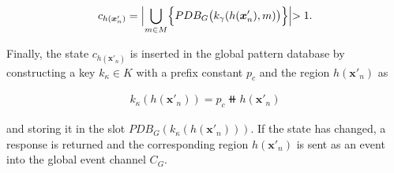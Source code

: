  \begin{align*}
    c_{h(\bm{x}'_n)} = \Bigl| \bigcup_{m \in M} \Bigl\{ PDB_G\bigl(k_\gamma(h(\bm{x}'_n), m)\bigl) \Bigl\}\Bigl| > 1.
 \end{align*}

 Finally, the state $c_{h(\bm{x}'_n)}$ is inserted in the global pattern database by constructing a key $k_\kappa \in K$ with a prefix constant $p_c$ and the region $h(\bm{x}'_n)$ as

 \begin{align*}
     k_\kappa(h(\bm{x}'_n)) = p_c \doubleplus h(\bm{x}'_n)
 \end{align*}

and storing it in the slot $PDB_G(k_\kappa(h(\bm{x}'_n)))$. If the state has changed, a response is returned and the corresponding region $h(\bm{x}'_n)$ is sent as an event into the global event channel $C_G$.
